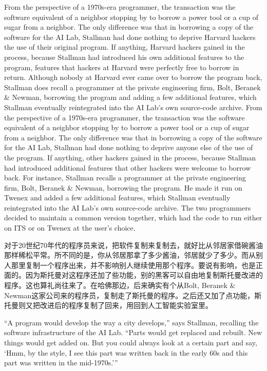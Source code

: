 \ifdefined\eng
\ifdefined\vone
From the perspective of a 1970s-era programmer, the transaction was the software equivalent of a neighbor stopping by to borrow a power tool or a cup of sugar from a neighbor. The only difference was that in borrowing a copy of the software for the AI Lab, Stallman had done nothing to deprive Harvard hackers the use of their original program. If anything, Harvard hackers gained in the process, because Stallman had introduced his own additional features to the program, features that hackers at Harvard were perfectly free to borrow in return. Although nobody at Harvard ever came over to borrow the program back, Stallman does recall a programmer at the private engineering firm, Bolt, Beranek \& Newman, borrowing the program and adding a few additional features, which Stallman eventually reintegrated into the AI Lab's own source-code archive.
\fi
\ifdefined\vtwo
From the perspective of a 1970s-era programmer, the transaction was the software equivalent of a neighbor stopping by to borrow a power tool or a cup of sugar from a neighbor. The only difference was that in borrowing a copy of the software for the AI Lab, Stallman had done nothing to deprive anyone else of the use of the program. If anything, other hackers gained in the process, because Stallman had introduced additional features that other hackers were welcome to borrow back. For instance, Stallman recalls a programmer at the private engineering firm, Bolt, Beranek \& Newman, borrowing the program. He made it run on Twenex and added a few additional features, which Stallman eventually reintegrated into the AI Lab's own source-code archive. The two programmers decided to maintain a common version together, which had the code to run either on ITS or on Twenex at the user's choice.
\fi
\fi

\ifdefined\chs
对于20世纪70年代的程序员来说，把软件复制来复制去，就好比从邻居家借碗酱油那样稀松平常。所不同的是，你从邻居那拿了多少酱油，邻居就少了多少。而从别人那里复制一个程序出来，并不影响别人继续使用那个程序。要说有影响，也是正面的。因为斯托曼对这程序还加了些功能，别的黑客可以自由地复制斯托曼改进的程序。这也算礼尚往来了。在哈佛那边，后来确实有个从Bolt, Beranek \& Newman这家公司来的程序员，复制走了斯托曼的程序。之后还又加了点功能，斯托曼则又把改进后的程序复制了回来，用回到人工智能实验室里。
\fi

\ifdefined\eng
``A program would develop the way a city develops,'' says Stallman, recalling the software infrastructure of the AI Lab. ``Parts would get replaced and rebuilt. New things would get added on. But you could always look at a certain part and say, `Hmm, by the style, I see this part was written back in the early 60s and this part was written in the mid-1970s.'\hspace{0.01in}''
\fi

